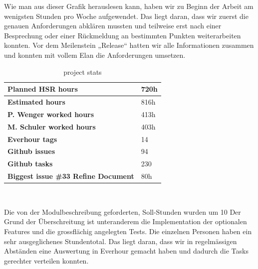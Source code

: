 Wie man aus dieser Grafik herauslesen kann, haben wir zu Beginn der Arbeit 
am wenigsten Stunden pro Woche aufgewendet. Das liegt daran, dass wir zuerst die 
genauen Anforderungen abklären mussten und teilweise erst nach einer Besprechung 
oder einer Rückmeldung an bestimmten Punkten weiterarbeiten konnten. 
Vor dem Meilenstein „Release“ hatten wir alle Informationen zusammen und 
konnten mit vollem Elan die Anforderungen umsetzen.


\begin{table}[H]
  \centering
  \begin{tabular}{|p{100mm}|p{35mm}|}
    \hline 	\bf Planned HSR hours & 720h \\ \hline
	\bf Estimated hours & 816h \\ \hline
	\bf P. Wenger worked hours & 413h \\ \hline
	\bf M. Schuler worked hours & 403h \\ \hline
	\bf Everhour tags & 14 \\ \hline
	\bf Github issues & 94 \\ \hline
	\bf Github tasks & 230 \\ \hline
	\bf Biggest issue \#33 Refine Document & 80h \\ \hline
  \end{tabular} \\
  \caption{project stats}
  \label{tab:projectstats}
\end{table}


Die von der Modulbeschreibung geforderten, Soll-Stunden wurden um 10%
Der Grund der Überschreitung ist unteranderem
die Implementation der optionalen Features und die grossflächig angelegten Tests.
Die einzelnen Personen haben ein sehr ausgeglichenes Stundentotal. 
Das liegt daran, dass wir in regelmässigen Abständen eine Auswertung 
in Everhour gemacht haben und dadurch die Tasks gerechter verteilen konnten. 

